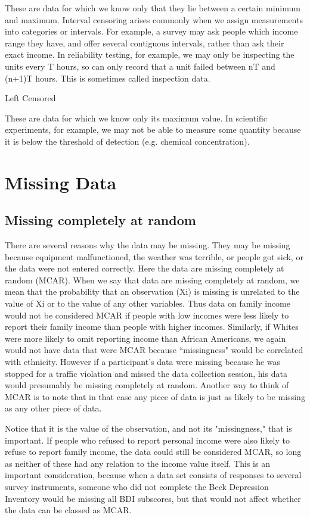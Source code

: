 \documentclass[12pt, a4paper]{report}
\begin{document}
These are data for which we know only that they lie between a certain minimum and maximum. Interval censoring arises commonly when we assign measurements into categories or intervals. For example, a survey may ask people which income range they have, and offer several contiguous intervals, rather than ask their exact income. In reliability testing, for example, we may only be inspecting the units every T hours, so can only record that a unit failed between nT and (n+1)T hours. This is sometimes called inspection data.


Left Censored

These are data for which we know only its maximum value. In scientific experiments, for example, we may not be able to measure some quantity because it is below the threshold of detection (e.g. chemical concentration).


\section{Missing Data}


\subsection{Missing completely at random}
There are several reasons why the data may be missing. They may be missing because equipment malfunctioned, the weather was terrible, or people got sick, or the data were not entered correctly. Here the data are missing completely at random (MCAR). When we say that data are missing completely at random, we mean that the probability that an observation (Xi) is missing is unrelated to the value of Xi or to the value of any other variables. Thus data on family income would not be considered MCAR if people with low incomes were less likely to report their family income than people with higher incomes. Similarly, if Whites were more likely to omit reporting income than African Americans, we again would not have data that were MCAR because ``missingness" would be correlated with ethnicity. However if a participant's data were missing because he was stopped for a traffic violation and missed the data collection session, his data would presumably be missing completely at random. Another way to think of MCAR is to note that in that case any piece of data is just as likely to be missing as any other piece of data.

Notice that it is the value of the observation, and not its "missingness," that is important. If people who refused to report personal income were also likely to refuse to report family income, the data could still be considered MCAR, so long as neither of these had any relation to the income value itself. This is an important consideration, because when a data set consists of responses to several survey instruments, someone who did not complete the Beck Depression Inventory would be missing all BDI subscores, but that would not affect whether the data can be classed as MCAR.
\end{document}
